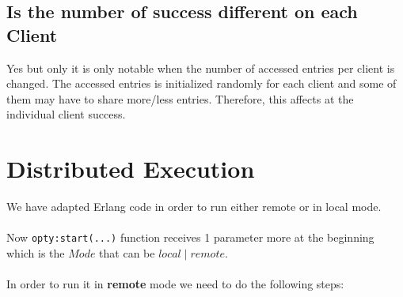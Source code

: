 \documentclass[a4paper, 10pt]{article}
\begin{document}
\subsection{Is the number of success different on each Client}
Yes but only it is only notable when the number of accessed entries per client is changed. The accessed entries is initialized randomly for each client and some of them may have to share more/less entries. Therefore, this affects at the individual client success.

\section{Distributed Execution}

We have adapted Erlang code in order to run either remote or in local mode.
\\\\
Now \lstinline|opty:start(...)| function receives 1 parameter more at the
beginning which is the $Mode$ that can be $local \mid remote$. 
\\\\
In order to run it in \textbf{remote} mode we need to do the following steps:
\end{document}
